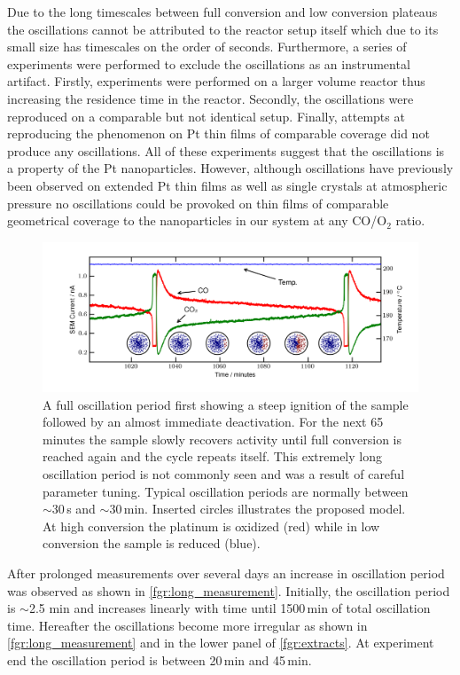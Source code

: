\documentclass[journal=jacsat,manuscript=article]{achemso}
\begin{document}
Due to the long timescales between full conversion and low conversion plateaus
the oscillations cannot be attributed to the reactor setup itself which due to
its small size has timescales on the order of seconds. Furthermore, a series of
experiments were performed to exclude the oscillations as an instrumental
artifact. Firstly, experiments were performed on a larger volume reactor thus
increasing the residence time in the reactor. Secondly, the oscillations were
reproduced on a comparable but not identical setup. Finally, attempts at
reproducing the phenomenon on Pt thin films of comparable coverage did not
produce any oscillations. All of these experiments suggest that the
oscillations is a property of the Pt nanoparticles. However, 
although oscillations have previously been observed on extended Pt thin films
\cite{Singh2010} as well as single crystals\cite{Hendriksen2005} at atmospheric
pressure no oscillations could be provoked on thin films of comparable
geometrical coverage to the nanoparticles in our system at any CO/O$_2$ ratio.

\begin{figure}
  \includegraphics[width=16cm]{single_full_oscillation.png}
  \caption{A full oscillation period first showing a steep ignition of the
  sample followed by an almost immediate deactivation. For the next 65 minutes
  the sample slowly recovers activity until full conversion is reached again
  and the cycle repeats itself. This extremely long oscillation period is not
  commonly seen and was a result of careful parameter tuning. Typical
  oscillation periods are normally between $\sim$30\,s and $\sim$30\,min.
  Inserted circles illustrates the proposed model. At high conversion the
  platinum is oxidized (red) while in low conversion the sample is reduced
  (blue).} \label{fgr:full_oscillation}
\end{figure}

After prolonged measurements over several days an increase in oscillation
period was observed as shown in \ref{fgr:long_measurement}. Initially, the
oscillation period is $\sim$2.5 min and increases linearly with time until 1500\,min
of total oscillation time. Hereafter the oscillations become more irregular
as shown in \ref{fgr:long_measurement} and in the lower panel of \ref{fgr:extracts}. At
experiment end the oscillation period is between 20\,min and 45\,min.
\end{document}
